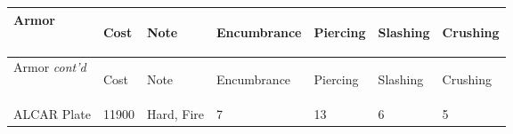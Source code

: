 \documentclass[twoside]{book}
\begin{document}
\begin{longtable}{p{1.25in}llp{2em}p{2em}p{2em}p{2em}} 
  Armor
  &
  \begin{turn}{70}{Cost}\end{turn}
          
  &
  \begin{turn}{70}{Note}\end{turn}
          
  &
  \begin{turn}{70}{Encumbrance}\end{turn}
          
  &
  \begin{turn}{70}{Piercing}\end{turn}
          
  &
  \begin{turn}{70}{Slashing}\end{turn}
          
  &
  \begin{turn}{70}{Crushing}\end{turn}
          
  \\
  \hline
  \hline
  \endfirsthead
  Armor \textit{cont'd}
        
  &
  \begin{turn}{70}{Cost}\end{turn}
          
  &
  \begin{turn}{70}{Note}\end{turn}
          
  &
  \begin{turn}{70}{Encumbrance}\end{turn}
          
  &
  \begin{turn}{70}{Piercing}\end{turn}
          
  &
  \begin{turn}{70}{Slashing}\end{turn}
          
  &
  \begin{turn}{70}{Crushing}\end{turn}
          
  \\
  \endhead
      
  \raggedright
           ALCAR Plate 
  &
   11900 
  &
   Hard, Fire 
  &
   7 
  &
   13 
  &
   6 
  &
   5 
  \tabularnewline
  \hline
      

\end{longtable}
\end{document}
